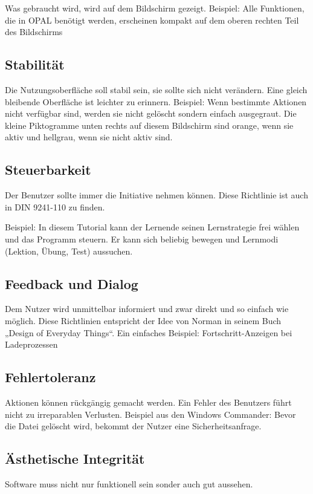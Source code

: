 Was gebraucht wird, wird auf dem Bildschirm gezeigt.
Beispiel: Alle Funktionen, die in OPAL benötigt werden, erscheinen kompakt auf dem oberen rechten Teil des Bildschirms


\subsection{Stabilität}
Die Nutzungsoberfläche soll stabil sein, sie sollte sich nicht verändern. Eine gleich bleibende Oberfläche ist leichter zu erinnern. 
Beispiel: Wenn bestimmte Aktionen nicht verfügbar sind, werden sie nicht gelöscht sondern einfach ausgegraut. Die kleine Piktogramme unten rechts auf diesem Bildschirm sind orange, wenn sie aktiv und hellgrau, wenn sie nicht aktiv sind.

\subsection{Steuerbarkeit}
Der Benutzer sollte immer die Initiative nehmen können. Diese Richtlinie ist auch in DIN 9241-110 zu finden.

Beispiel: In diesem Tutorial kann der Lernende seinen Lernstrategie frei wählen und das Programm steuern. Er kann sich beliebig bewegen und Lernmodi (Lektion, Übung, Test) aussuchen.

\subsection{Feedback und Dialog}
Dem Nutzer wird unmittelbar informiert und zwar direkt und so einfach wie möglich. Diese Richtlinien entspricht der Idee von Norman in seinem Buch „Design of Everyday Things“.
Ein einfaches Beispiel: Fortschritt-Anzeigen bei Ladeprozessen

\subsection{Fehlertoleranz}
Aktionen können rückgängig gemacht werden. Ein Fehler des Benutzers führt nicht zu irreparablen Verlusten.
Beispiel aus den Windows Commander: Bevor die Datei gelöscht wird, bekommt der Nutzer eine Sicherheitsanfrage.

\subsection{Ästhetische Integrität}
Software muss nicht nur funktionell sein sonder auch gut aussehen. 

